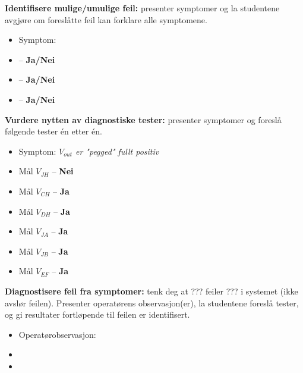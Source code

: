 \vskip 10pt


\noindent
{\bf Identifisere mulige/umulige feil:} presenter symptomer og la studentene avgjøre om foreslåtte feil kan forklare alle symptomene.

\begin{itemize}
\item{} Symptom: {\it }
\item{}  -- {\bf Ja/Nei}
\item{}  -- {\bf Ja/Nei}
\item{}  -- {\bf Ja/Nei}
\end{itemize}


\vskip 10pt


\noindent
{\bf Vurdere nytten av diagnostiske tester:} presenter symptomer og foreslå følgende tester én etter én.

\begin{itemize}
\item{} Symptom: {\it $V_{out}$ er "pegged" fullt positiv}
\item{} Mål $V_{JH}$ -- {\bf Nei}
\item{} Mål $V_{CH}$ -- {\bf Ja}
\item{} Mål $V_{DH}$ -- {\bf Ja}
\item{} Mål $V_{JA}$ -- {\bf Ja}
\item{} Mål $V_{JB}$ -- {\bf Ja}
\item{} Mål $V_{EF}$ -- {\bf Ja}
\end{itemize}


\vskip 10pt


\noindent
{\bf Diagnostisere feil fra symptomer:} tenk deg at ??? feiler ??? i systemet (ikke avslør feilen). Presenter operatørens observasjon(er), la studentene foreslå tester, og gi resultater fortløpende til feilen er identifisert.

\begin{itemize}
\item{} Operatørobservasjon: {\it }
\item{}
\item{}
\end{itemize}

